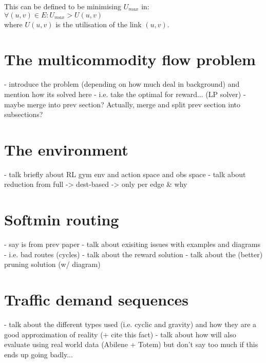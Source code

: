 This can be defined to be minimising $U_{max}$ in:\\
$\forall (u,v) \in E: U_{max} > U(u,v)$\\
where $U(u,v)$ is the utilisation of the link $(u,v)$.


\section{The multicommodity flow problem}
 - introduce the problem (depending on how much deal in background) and mention how its solved here
 - i.e. take the optimal for reward... (LP solver)
 - maybe merge into prev section? Actually, merge and split prev section into subsections?


 \section{The environment}
 - talk briefly about RL gym env and action space and obs space
 - talk about reduction from full -> dest-based -> only per edge \& why


\section{Softmin routing}
- say is from prev paper
- talk about exisiting issues with examples and diagrams
- i.e. bad routes (cycles)
- talk about the reward solution
- talk about the (better) pruning solution (w/ diagram)


\section{Traffic demand sequences}
- talk about the different types used (i.e. cyclic and gravity) and how they are a good approximation of reality (+ cite this fact)
- talk about how will also evaluate using real world data (Abilene + Totem) but don't say too much if this ends up going badly...
